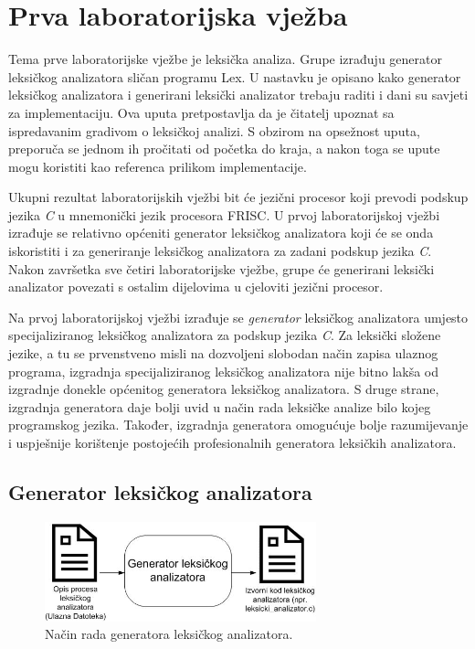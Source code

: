 \documentclass[times, 12pt, utf8]{book}
\begin{document}
\chapter{Prva laboratorijska vježba}\label{chap:I}
Tema prve laboratorijske vježbe je leksička analiza.
Grupe izrađuju generator leksičkog analizatora sličan programu Lex.
U nastavku je opisano kako generator leksičkog analizatora i generirani leksički analizator trebaju raditi i dani su savjeti za implementaciju.
Ova uputa pretpostavlja da je čitatelj upoznat sa ispredavanim gradivom o leksičkoj analizi.
S obzirom na opsežnost uputa, preporuča se jednom ih pročitati od početka do kraja, a nakon toga se upute mogu koristiti kao referenca prilikom implementacije.

Ukupni rezultat laboratorijskih vježbi bit će jezični procesor koji prevodi podskup jezika \emph{C} u mnemonički jezik procesora FRISC.
U prvoj laboratorijskoj vježbi izrađuje se relativno općeniti generator leksičkog analizatora koji će se onda iskoristiti i za generiranje leksičkog analizatora za zadani podskup jezika \emph{C}.
Nakon završetka sve četiri laboratorijske vježbe, grupe će generirani leksički analizator povezati s ostalim dijelovima u cjeloviti jezični procesor.

Na prvoj laboratorijskoj vježbi izrađuje se \emph{generator} leksičkog analizatora umjesto specijaliziranog leksičkog analizatora za podskup jezika \emph{C}.
Za leksički složene jezike, a tu se prvenstveno misli na dozvoljeni slobodan način zapisa ulaznog programa, izgradnja specijaliziranog leksičkog analizatora nije bitno lakša od izgradnje donekle općenitog generatora leksičkog analizatora.
S druge strane, izgradnja generatora daje bolji uvid u način rada leksičke analize bilo kojeg programskog jezika.
Također, izgradnja generatora omogućuje bolje razumijevanje i uspješnije korištenje postojećih profesionalnih generatora leksičkih analizatora.

\section{Generator leksičkog analizatora}

\begin{figure}[htb!]
\centering
\includegraphics[width=0.7\textwidth]{slike/generator-leksickog-analizatora.jpg}
\caption{Način rada generatora leksičkog analizatora.}
\label{fig:generator-leksickog-analizatora}
\end{figure}
\end{document}
